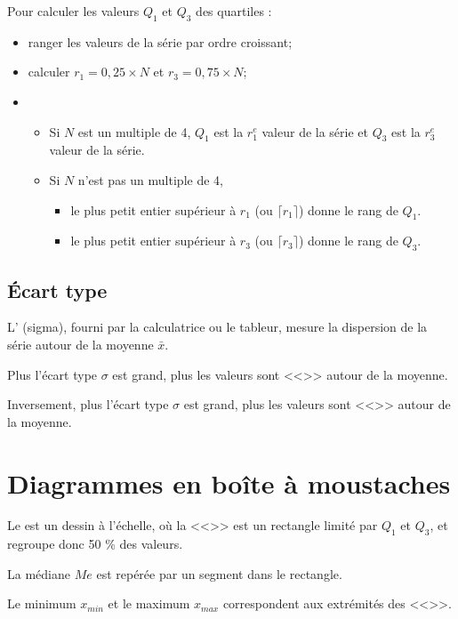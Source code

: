 \documentclass[12pt,a4paper]{article}
\begin{document}
\begin{mymeth}
	Pour calculer les valeurs $Q_1$ et $Q_3$ des quartiles :
	\begin{itemize}
		\item ranger les valeurs de la série par ordre croissant;
		\item calculer $r_1 = 0,25 \times N$ et $r_3 = 0,75 \times N$;
		\item \begin{itemize}
				\item Si $N$ est un multiple de 4, $Q_1$ est la $r_1^e$ valeur de la série et $Q_3$ est la $r_3^e$ valeur de la série.
				\item Si $N$ n'est pas un multiple de 4, \begin{itemize}
					\item le plus petit entier supérieur à $r_1$ (ou $ \lceil r_1\rceil$) donne le rang de $Q_1$.
					\item le plus petit entier supérieur à $r_3$ (ou $\lceil r_3\rceil$) donne le rang de $Q_3$.
					
				\end{itemize}
			\end{itemize}
	\end{itemize}
\end{mymeth}




\subsection{\'Ecart type}

\begin{mydef}
	L' (sigma), fourni par la calculatrice ou le tableur, mesure la dispersion de la série autour de la moyenne $\bar{x}$. 
	
	Plus l'écart type $\sigma$ est grand, plus les valeurs sont <<>> autour de la moyenne. 
	
	Inversement, plus l'écart type $\sigma$ est grand, plus les valeurs sont <<>> autour de la moyenne.
\end{mydef}	


			

\section{Diagrammes en boîte à moustaches}

\begin{mydef}
	Le  est un dessin à l'échelle, où la <<>> est un rectangle limité par $Q_1$ et $Q_3$, et regroupe donc 50 \% des valeurs.
	
	La médiane $Me$ est repérée par un segment dans le rectangle.
	
	Le minimum $x_{min}$ et le maximum $x_{max}$ correspondent aux extrémités des <<>>.
\end{mydef}


\end{document}
